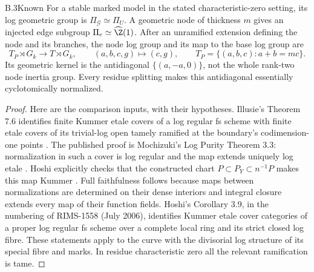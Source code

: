 \begin{claim}{B.3}{Known}
For a stable marked model in the stated characteristic-zero setting, its log
geometric group is $\Pi_{\mathcal G}\simeq\Pi_U$. A geometric node of thickness
$m$ gives an injected edge subgroup $\Pi_e\simeq\widehat\Z(1)$. After an
unramified extension defining the node and its branches, the node log group
and its map to the base log group are
\[
 T_P\rtimes G_k\longrightarrow T\rtimes G_k,
 \qquad (a,b,c,g)\longmapsto(c,g),\qquad
 T_P=\{(a,b,c):a+b=mc\}.
\]
Its geometric kernel is the antidiagonal $\{(a,-a,0)\}$, not the whole
rank-two node inertia group. Every residue splitting makes this antidiagonal
essentially cyclotomically normalized.
\end{claim}
\begin{proof}
Here are the comparison inputs, with their hypotheses. Illusie's Theorem 7.6
identifies finite Kummer etale covers of a log regular fs scheme with finite
etale covers of its trivial-log open tamely ramified at the boundary's
codimension-one points \citep[Theorem 7.6]{BC_Illusie}. The published proof is
Mochizuki's Log Purity Theorem 3.3: normalization in such a cover is log
regular and the map extends uniquely log etale
\citep[Theorem 3.3]{BC_MochExt}. Hoshi explicitly checks that the constructed
chart $P\subset P_Y\subset n^{-1}P$ makes this map Kummer
\citep[Remark 1.10]{BC_Hoshi}. Full faithfulness follows because maps between
normalizations are determined on their dense interiors and integral closure
extends every map of their function fields. Hoshi's Corollary 3.9, in the
numbering of RIMS-1558 (July 2006), identifies Kummer etale cover categories
of a proper log regular fs scheme over a complete local ring and its strict
closed log fibre. These statements apply to the curve with the divisorial
log structure of its special fibre and marks. In residue characteristic zero
all the relevant ramification is tame.


\end{proof}
